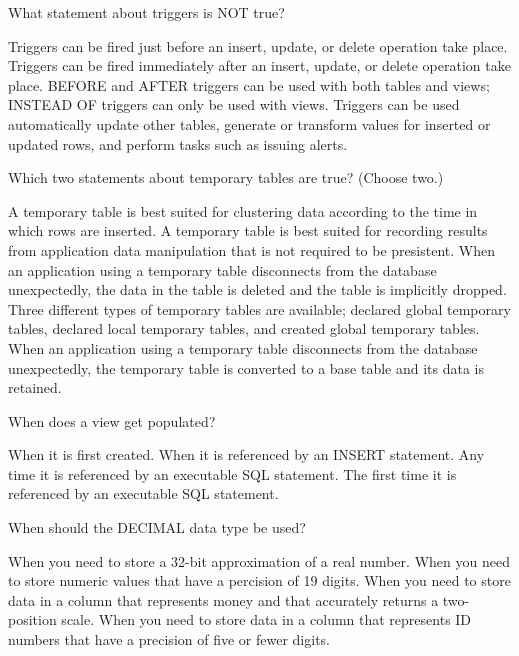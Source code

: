 \documentclass[11pt]{exam}
\begin{document}
\begin{questions}
\question[1]

\begin{choices}
\choice 
\choice 
\choice 
\choice 
\end{choices}

\question[1]
What statement about triggers is NOT true?
\begin{choices}
\choice Triggers can  be fired just before an insert, update, or delete operation take place.
\choice Triggers can be fired immediately after an insert, update, or delete operation take place.
\choice BEFORE and AFTER triggers can be used with both tables and views; INSTEAD OF triggers can only be used with views.
\choice Triggers can be used automatically update other tables, generate or transform values for inserted or updated rows,
and perform tasks such as issuing alerts.
\end{choices}


\question[1]
Which two statements about temporary tables are true? (Choose two.)
\begin{choices}
\choice A temporary table is best suited for clustering data according to the time in which rows are inserted.
\choice A temporary table is best suited for recording results from application data manipulation that is not required
to be presistent.
\choice When an application using a temporary table disconnects from the database unexpectedly, the data in the table
is deleted and the table is implicitly dropped.
\choice Three different types of temporary tables are available; declared global temporary tables, declared local temporary
tables, and created global temporary tables.
\choice When an application using a temporary table disconnects from the database unexpectedly, the temporary table is
converted to a base table and its data is retained.
\end{choices}


\question[1]
When does a view get populated?
\begin{choices}
\choice When it is first created.
\choice When it is referenced by an INSERT statement.
\choice Any time it is referenced by an executable SQL statement.
\choice The first time it is referenced by an executable SQL statement.
\end{choices}


\question[1]
When should the DECIMAL data type be used?
\begin{choices}
\choice When you need to store a 32-bit approximation of a real number. 
\choice When you need to store numeric values that have a percision of 19 digits.
\choice When you need to store data in a column that represents money and that accurately returns a two-position scale.
\choice When you need to store data in a column that represents ID numbers that have a precision of five or fewer digits.
\end{choices}


\end{questions}
\end{document}
